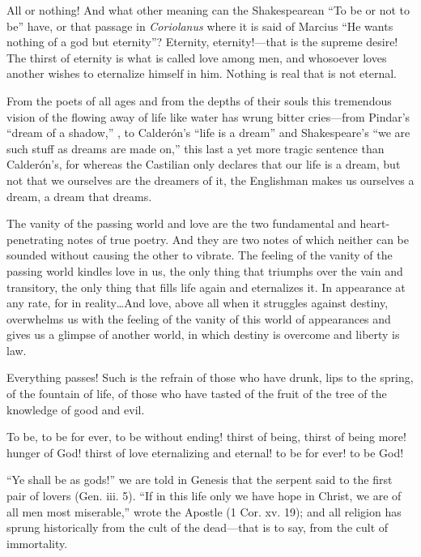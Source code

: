 All or nothing! And what other meaning can the Shakespearean ``To be
or not to be'' have, or that passage in \textit{Coriolanus} where it
is said of Marcius ``He wants nothing of a god but eternity''?
Eternity, eternity!---that is the supreme desire! The thirst of
eternity is what is called love among men, and whosoever loves another
wishes to eternalize himself in him. Nothing is real that is not
eternal.

From the poets of all ages and from the depths of their souls this
tremendous vision of the flowing away of life like water has wrung
bitter cries---from Pindar's ``dream of a shadow,'' ,
to Calder\'on's ``life is a dream'' and Shakespeare's ``we are such
stuff as dreams are made on,'' this last a yet more tragic sentence
than Calder\'on's, for whereas the Castilian only declares that our
life is a dream, but not that we ourselves are the dreamers of it, the
Englishman makes us ourselves a dream, a dream that dreams.

The vanity of the passing world and love are the two fundamental and
heart-penetrating notes of true poetry. And they are two notes of
which neither can be sounded without causing the other to vibrate. The
feeling of the vanity of the passing world kindles love in us, the
only thing that triumphs over the vain and transitory, the only thing
that fills life again and eternalizes it. In appearance at any rate,
for in reality\ldots And love, above all when it struggles against
destiny, overwhelms us with the feeling of the vanity of this world of
appearances and gives us a glimpse of another world, in which destiny
is overcome and liberty is law.

Everything passes! Such is the refrain of those who have
drunk, lips to the spring, of the fountain of life, of those who have
tasted of the fruit of the tree of the knowledge of good and evil.

To be, to be for ever, to be without ending! thirst of being, thirst
of being more! hunger of God! thirst of love eternalizing and eternal!
to be for ever! to be God!

``Ye shall be as gods!'' we are told in Genesis that the serpent said
to the first pair of lovers (Gen. iii. 5). ``If in this life only we
have hope in Christ, we are of all men most miserable,'' wrote the
Apostle (1 Cor. xv. 19); and all religion has sprung historically from
the cult of the dead---that is to say, from the cult of immortality.


